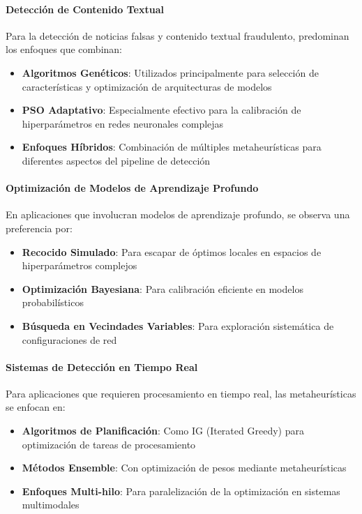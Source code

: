 \paragraph{Detección de Contenido Textual}
Para la detección de noticias falsas y contenido textual fraudulento, predominan los enfoques que combinan:
\begin{itemize}
    \item \textbf{Algoritmos Genéticos}: Utilizados principalmente para selección de características y optimización de arquitecturas de modelos \cite{aqil2021modeling, hidayattullah2020financial}
    \item \textbf{PSO Adaptativo}: Especialmente efectivo para la calibración de hiperparámetros en redes neuronales complejas \cite{deshai2023unmasking, bacanin2023benefits}
    \item \textbf{Enfoques Híbridos}: Combinación de múltiples metaheurísticas para diferentes aspectos del pipeline de detección \cite{yildirim2023novel}
\end{itemize}

\paragraph{Optimización de Modelos de Aprendizaje Profundo}
En aplicaciones que involucran modelos de aprendizaje profundo, se observa una preferencia por:
\begin{itemize}
    \item \textbf{Recocido Simulado}: Para escapar de óptimos locales en espacios de hiperparámetros complejos \cite{bacanin2023benefits}
    \item \textbf{Optimización Bayesiana}: Para calibración eficiente en modelos probabilísticos \cite{horak2023gaussian}
    \item \textbf{Búsqueda en Vecindades Variables}: Para exploración sistemática de configuraciones de red \cite{kapunac2023variable}
\end{itemize}

\paragraph{Sistemas de Detección en Tiempo Real}
Para aplicaciones que requieren procesamiento en tiempo real, las metaheurísticas se enfocan en:
\begin{itemize}
    \item \textbf{Algoritmos de Planificación}: Como IG (Iterated Greedy) para optimización de tareas de procesamiento \cite{aqil2021modeling}
    \item \textbf{Métodos Ensemble}: Con optimización de pesos mediante metaheurísticas \cite{das2022heuristic, yasmin2024ensemble}
    \item \textbf{Enfoques Multi-hilo}: Para paralelización de la optimización en sistemas multimodales \cite{yildirim2023novel}
\end{itemize}

